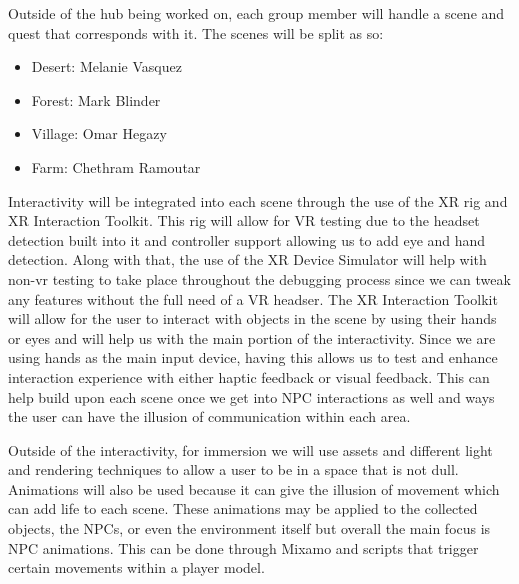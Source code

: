 \documentclass{vgtc}                          %
\begin{document}
Outside of the hub being worked on, each group member will handle a scene and quest that corresponds with it. The scenes will be split as so:
\begin{itemize}
  \item Desert: Melanie Vasquez
  \item Forest: Mark Blinder
  \item Village: Omar Hegazy
  \item Farm: Chethram Ramoutar
\end{itemize}

Interactivity will be integrated into each scene through the use of the XR rig and XR Interaction Toolkit. This rig will allow for VR testing due to the headset detection built into it and controller support allowing us to add eye and hand detection.
Along with that, the use of the XR Device Simulator will help with non-vr testing to take place throughout the debugging process since we can tweak any features without the full need of a VR headser. The XR Interaction Toolkit will allow for the user to
interact with objects in the scene by using their hands or eyes and will help us with the main portion of the interactivity. Since we are using hands as the main input device, having this allows us to test and enhance interaction experience with either haptic feedback
or visual feedback. This can help build upon each scene once we get into NPC interactions as well and ways the user can have the illusion of communication within each area.

Outside of the interactivity, for immersion we will use assets and different light and rendering techniques to allow a user to be in a space that is not dull. Animations will also be used because it can give the illusion of movement which can add life to each scene.
These animations may be applied to the collected objects, the NPCs, or even the environment itself but overall the main focus is NPC animations. This can be done through Mixamo and scripts that trigger certain movements within a player model.




%

%
%
%


\end{document}
